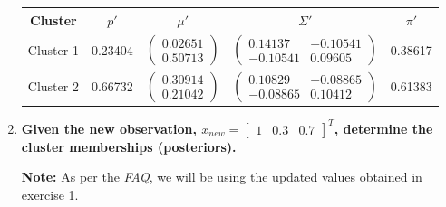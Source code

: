 \documentclass[12pt]{article}
\begin{document}
\begin{enumerate}[leftmargin=\labelsep]
        \begin{center}
          \captionsetup{type=table}
          \begin{tabular}{c|cccc}
            Cluster                                                                  & $p'$ & $\mu'$ & $\Sigma'$ & $\pi'$ \\
            \hline
            \colorbox{bmint}{Cluster 1}                                              &
            0.23404                                                                  &
            $\begin{pmatrix} 0.02651 \\ 0.50713 \end{pmatrix}$                       &
            $\begin{pmatrix} 0.14137 & -0.10541 \\ -0.10541 & 0.09605 \end{pmatrix}$ &
            0.38617                                                                                                       \\
            \colorbox{byellow}{Cluster 2}                                            &
            0.66732                                                                  &
            $\begin{pmatrix} 0.30914 \\ 0.21042 \end{pmatrix}$                       &
            $\begin{pmatrix} 0.10829 & -0.08865 \\ -0.08865 & 0.10412 \end{pmatrix}$ &
            0.61383                                                                                                       \\
          \end{tabular}
          \label{exI1-updated-params-table}
        \end{center}

  \item \textbf{Given the new observation, $x_{new} = \begin{bmatrix} 1 & 0.3 & 0.7 \end{bmatrix}^T$, determine the cluster memberships (posteriors).}

        \vskip 0.3cm
        \textbf{Note:} As per the \textit{FAQ}, we will be using the updated values obtained in exercise 1.


\end{enumerate}
\end{document}
